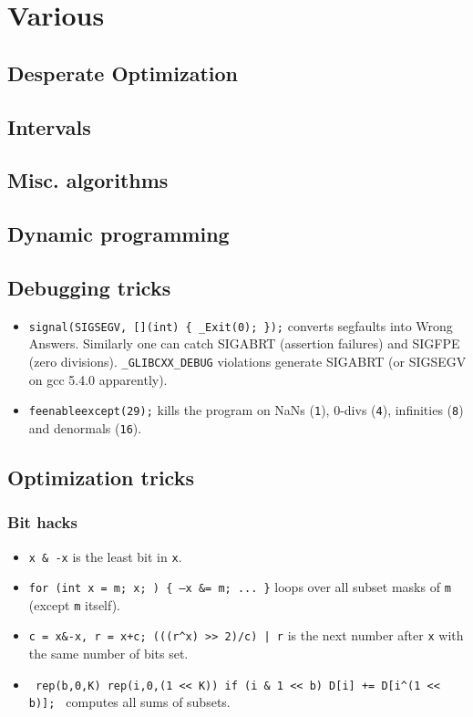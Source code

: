 \chapter{Various}

\section{Desperate Optimization}

\section{Intervals}

\section{Misc. algorithms}

\section{Dynamic programming}

\section{Debugging tricks}
\begin{itemize}
	\item \texttt{signal(SIGSEGV, [](int) \{ \_Exit(0); \});} converts segfaults into Wrong Answers.
	      Similarly one can catch SIGABRT (assertion failures) and SIGFPE (zero divisions).
	      \texttt{\_GLIBCXX\_DEBUG} violations generate SIGABRT (or SIGSEGV on gcc 5.4.0 apparently).
	\item \texttt{feenableexcept(29);} kills the program on NaNs (\texttt 1), 0-divs (\texttt 4), infinities (\texttt 8) and denormals (\texttt{16}).
\end{itemize}

\section{Optimization tricks}
\subsection{Bit hacks}
\begin{itemize}
	\item \texttt{x \& -x} is the least bit in \texttt{x}.
	\item \texttt{for (int x = m; x; ) \{ --x \&= m; ... \}} loops over all subset masks of \texttt{m} (except \texttt{m} itself).
	\item \texttt{c = x\&-x, r = x+c; (((r\^{}x) >> 2)/c) | r} is the next number after \texttt{x} with the same number of bits set.
	\item \texttt{ rep(b,0,K) rep(i,0,(1 << K)) if (i \& 1 << b) D[i] += D[i\^{}(1 << b)]; } computes all sums of subsets.
\end{itemize}

